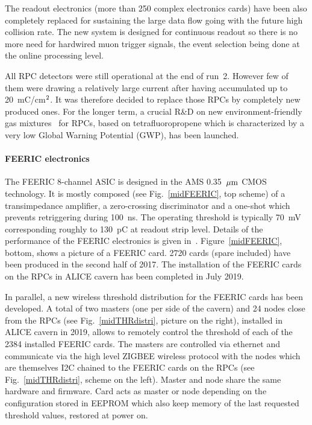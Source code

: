 The readout electronics (more than 250 complex electronics cards) have been also completely replaced for sustaining the large data flow going with the future high collision rate. 
The new system is designed for continuous readout so there is no more need for hardwired muon trigger signals, the event selection being done at the online processing level. 

All RPC detectors were still operational at the end of run~2. However few of them were drawing a relatively large current after having accumulated up to 20~mC/cm$^{\rm 2}$.
It was therefore decided to replace those RPCs by completely new produced ones. For the longer term, a crucial R\&D on new environment-friendly 
gas mixtures~\cite{mid:RPCgasmix} for RPCs, based on tetrafluoropropene which is characterized by a very low Global Warning Potential (GWP), has been launched.


\paragraph{FEERIC electronics\\}
 
The FEERIC 8-channel ASIC is designed in the AMS 0.35~$\mu{\rm m}$ CMOS technology. It is mostly composed (see Fig.~\ref{midFEERIC}, top scheme) of a transimpedance amplifier, a zero-crossing discriminator and a one-shot 
which prevents retriggering during 100~ns. The operating threshold is typically 70~mV corresponding roughly to 130~pC at readout strip level. Details of the performance of the FEERIC electronics 
is given in~\cite{mid:FEERIC-PRR}. Figure~\ref{midFEERIC}, bottom, shows a picture of a FEERIC card. 2720 cards (spare included) have been produced in the second half of 2017.
The installation of the FEERIC cards on the RPCs in ALICE cavern has been completed in July 2019. 

In parallel, a new wireless threshold distribution for the FEERIC cards has been developed. 
A total of two masters (one per side of the cavern) and 24 nodes close from the RPCs (see Fig.~\ref{midTHRdistri}, picture on the right), installed in ALICE cavern in 2019, allows to remotely control the threshold of each of the 2384 installed 
FEERIC cards. The masters are controlled via ethernet and communicate via the high level ZIGBEE wireless protocol with the nodes which are themselves I2C chained to the FEERIC cards on the RPCs (see Fig.~\ref{midTHRdistri}, 
scheme on the left). Master and node share the same hardware and firmware. Card acts as master or node depending on the configuration stored in EEPROM which also keep memory of the last requested threshold values, restored
at power on.  

